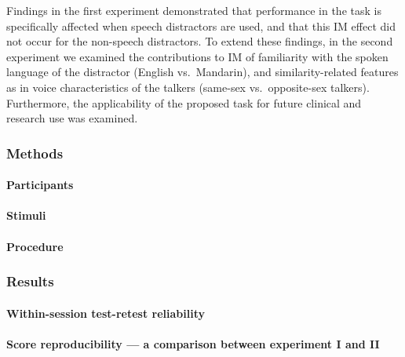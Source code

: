 \documentclass[a4paper,nobind]{templates/ociamthesis}
\begin{document}
Findings in the first experiment demonstrated that performance in the task is specifically affected when speech distractors are used, and that this IM effect did not occur for the non-speech distractors. To extend these findings, in the second experiment we examined the contributions to IM of familiarity with the spoken language of the distractor (English vs.~Mandarin), and similarity-related features as in voice characteristics of the talkers (same-sex vs.~opposite-sex talkers). Furthermore, the applicability of the proposed task for future clinical and research use was examined.

\hypertarget{methods-1}{%
\subsubsection{Methods}\label{methods-1}}

\hypertarget{participants-1}{%
\paragraph{Participants}\label{participants-1}}

\hypertarget{stimuli-1}{%
\paragraph{Stimuli}\label{stimuli-1}}

\hypertarget{procedure-1}{%
\paragraph{Procedure}\label{procedure-1}}

\hypertarget{results-1}{%
\subsubsection{Results}\label{results-1}}

\hypertarget{within-session-test-retest-reliability}{%
\paragraph{Within-session test-retest reliability}\label{within-session-test-retest-reliability}}

\hypertarget{score-reproducibility-a-comparison-between-experiment-i-and-ii}{%
\paragraph{Score reproducibility --- a comparison between experiment I and II}\label{score-reproducibility-a-comparison-between-experiment-i-and-ii}}
\end{document}
